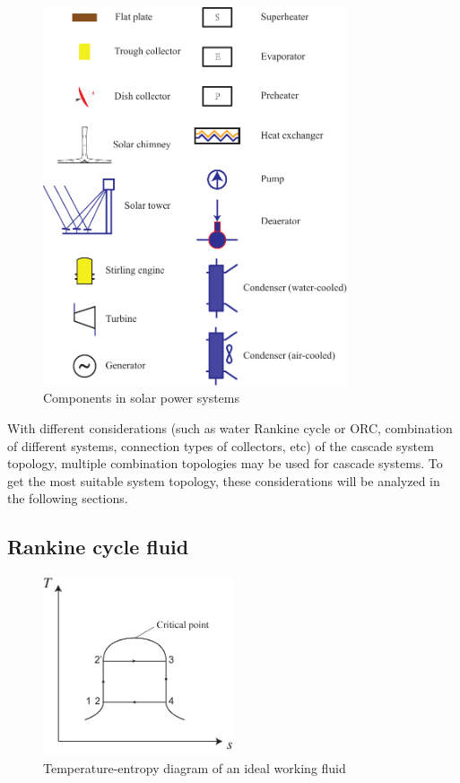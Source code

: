 \begin{figure}[!ht]
\centering
\includegraphics[width=0.8\textwidth]{fig/Legends.pdf}
\caption{Components in solar power systems}
\label{fig:Legends}
\end{figure}

With different considerations (such as water Rankine cycle or ORC, combination of different systems, connection types of collectors, etc) of the cascade system topology, multiple combination topologies may be used for cascade systems. To get the most suitable system topology, these considerations will be analyzed in the following sections. 

\subsection{Rankine cycle fluid}
\label{sec:RankineCycleFluid}

\begin{figure}[!ht]
\centering 
\includegraphics[width=0.5\textwidth]{fig/idealTs}
\caption{Temperature-entropy diagram of an ideal working fluid}\label{fig:idealTs}
\end{figure}

